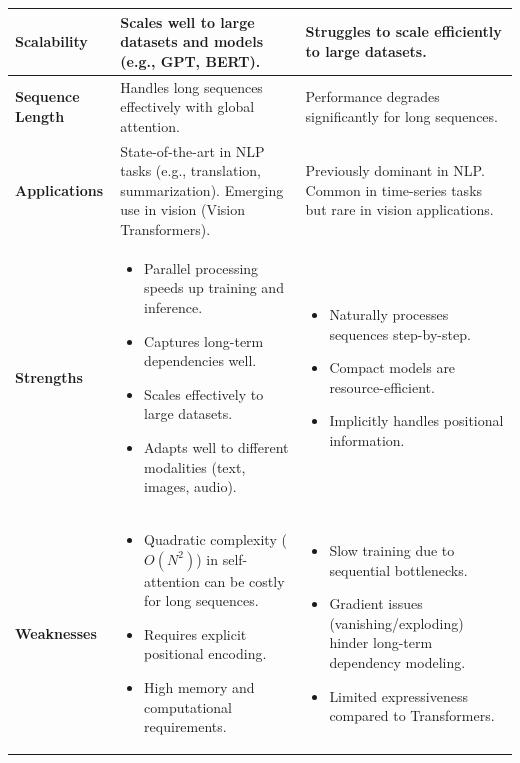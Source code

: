 \begin{longtable}{|>{\raggedright\arraybackslash}p{3.5cm}|>{\raggedright\arraybackslash}p{6cm}|>{\raggedright\arraybackslash}p{6cm}|}
\textbf{Scalability} & Scales well to large datasets and models (e.g., GPT, BERT). & Struggles to scale efficiently to large datasets. \\ \hline

\textbf{Sequence Length} & Handles long sequences effectively with global attention. & Performance degrades significantly for long sequences. \\ \hline

\textbf{Applications} & 
State-of-the-art in NLP tasks (e.g., translation, summarization). Emerging use in vision (Vision Transformers). & 
Previously dominant in NLP. Common in time-series tasks but rare in vision applications. \\ \hline

\textbf{Strengths} & 
\begin{itemize}
    \item Parallel processing speeds up training and inference.
    \item Captures long-term dependencies well.
    \item Scales effectively to large datasets.
    \item Adapts well to different modalities (text, images, audio).
\end{itemize} & 
\begin{itemize}
    \item Naturally processes sequences step-by-step.
    \item Compact models are resource-efficient.
    \item Implicitly handles positional information.
\end{itemize} \\ \hline

\textbf{Weaknesses} & 
\begin{itemize}
    \item Quadratic complexity (\(O(N^2)\)) in self-attention can be costly for long sequences.
    \item Requires explicit positional encoding.
    \item High memory and computational requirements.
\end{itemize} & 
\begin{itemize}
    \item Slow training due to sequential bottlenecks.
    \item Gradient issues (vanishing/exploding) hinder long-term dependency modeling.
    \item Limited expressiveness compared to Transformers.
\end{itemize} \\ \hline


\end{longtable}
